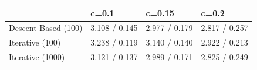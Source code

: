 \begin{tabular}{llll}
\toprule
 & c=0.1 & c=0.15 & c=0.2 \\
\midrule
Descent-Based (100) & 3.108 / 0.145 & 2.977 / 0.179 & 2.817 / 0.257 \\
Iterative (100) & 3.238 / 0.119 & 3.140 / 0.140 & 2.922 / 0.213 \\
Iterative (1000) & 3.121 / 0.137 & 2.989 / 0.171 & 2.825 / 0.249 \\
\bottomrule
\end{tabular}
